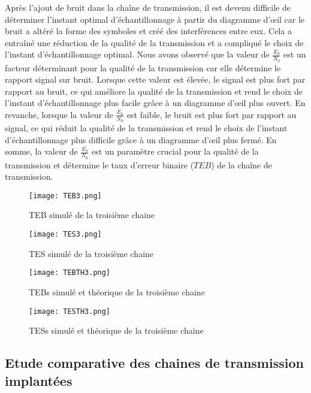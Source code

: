 \documentclass[11pt]{article}
\begin{document}
Après l'ajout de bruit dans la chaîne de transmission, il est devenu difficile de déterminer l'instant optimal d'échantillonnage à partir du diagramme d'œil car le bruit a altéré la forme des symboles et créé des interférences entre eux. Cela a entraîné une réduction de la qualité de la transmission et a compliqué le choix de l'instant d'échantillonnage optimal. Nous avons observé que la valeur de $\frac{E_b}{N_0}$ est un facteur déterminant pour la qualité de la transmission car elle détermine le rapport signal sur bruit. Lorsque cette valeur est élevée, le signal est plus fort par rapport au bruit, ce qui améliore la qualité de la transmission et rend le choix de l'instant d'échantillonnage plus facile grâce à un diagramme d'œil plus ouvert. En revanche, lorsque la valeur de $\frac{E_b}{N_0}$ est faible, le bruit est plus fort par rapport au signal, ce qui réduit la qualité de la transmission et rend le choix de l'instant d'échantillonnage plus difficile grâce à un diagramme d'œil plus fermé. En somme, la valeur de $\frac{E_b}{N_0}$ est un paramètre crucial pour la qualité de la transmission et détermine le taux d'erreur binaire ($TEB$) de la chaîne de transmission.
\clearpage
\begin{figure}[h]
  \centering
  \texttt{[image: TEB3.png]}
  \caption{TEB simulé de la troisième chaine}
  \label{fig:nom_de_la_figure}
\end{figure}

\begin{figure}[h]
  \centering
  \texttt{[image: TES3.png]}
  \caption{TES simulé de la troisième chaine}
  \label{fig:nom_de_la_figure}
\end{figure}

\begin{figure}[h]
  \centering
  \texttt{[image: TEBTH3.png]}
  \caption{TEBs simulé et théorique de la troisième chaine}
  \label{fig:nom_de_la_figure}
\end{figure}

\begin{figure}[h]
  \centering
  \texttt{[image: TESTH3.png]}
  \caption{TESs simulé et théorique de la troisième chaine}
  \label{fig:nom_de_la_figure}
\end{figure}

\newpage
\subsection{Etude comparative des chaines de transmission implantées}
\end{document}
